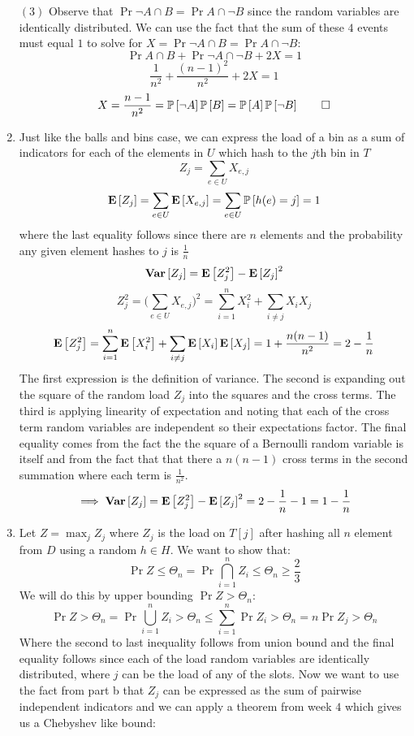 \documentclass[12pt]{article}
\begin{document}
\begin{solution}
\begin{enumerate}[label=(\alph*)]
$(3)$ Observe that $\Pr{\neg A \cap B} = \Pr{A \cap \neg B}$ since the random variables are identically distributed. We can use the fact that the sum of these $4$ events must equal $1$ to solve for $X = \Pr{\neg A \cap B} = \Pr{A \cap \neg B}$:
\[
\Pr{A \cap B} + \Pr{\neg A \cap \neg B} + 2X = 1
\]
\[
\frac{1}{n^2}+ \frac{(n-1)^2}{n^2} + 2X = 1
\]
\[
X = \frac{n-1}{n^2} = \Pr{\neg A}\Pr{B} = \Pr{A}\Pr{\neg B} \qed
\]
\item Just like the balls and bins case, we can express the load of a bin as a sum of indicators for each of the elements in $U$ which hash to the $j$th bin in $T$
\[
Z_j = \sum_{e\in U}{X_{e,j}}
\]
\[
\Exp{Z_j} = \sum_{e\in U}{\Exp{X_{e,j}}} = \sum_{e\in U}{\Pr{h(e) = j}} = 1
\]
where the last equality follows since there are $n$ elements and the probability any given element hashes to $j$ is $\frac{1}{n}$
\[
\Var{Z_j} = \Exp{Z^2_{j}} - \Exp{Z_{j}}^2
\]
\[
Z^2_{j} = \big(\sum_{e\in U}{X_{e,j}}\big)^2 = \sum_{i=1}^{n}{X^2_i} + \sum_{i\neq j}{X_iX_j}  
\]
\[
\Exp{Z^2_{j}} = \sum_{i=1}^{n}{\Exp{X^2_i}} + \sum_{i\neq j}{\Exp{X_i}\Exp{X_j}} = 1 + \frac{n(n-1)}{n^2} =2 -\frac{1}{n}
\]
The first expression is the definition of variance. The second is expanding out the square of the random load $Z_j$ into the squares and the cross terms. The third is applying linearity of expectation and noting that each of the cross term random variables are independent so their expectations factor. The final equality comes from the fact the the square of a Bernoulli random variable is itself and from the fact that that there a $n(n-1)$ cross terms in the second summation where each term is $\frac{1}{n^2}$. 
\[
\implies \Var{Z_j} = \Exp{Z^2_{j}} - \Exp{Z_{j}}^2 = 2 -\frac{1}{n} - 1 = 1 - \frac{1}{n}
\]
\item Let $Z = \max_{j}{Z_j}$ where $Z_j$ is the load on $T[j]$ after hashing all $n$ element from $D$ using a random $h\in H$. We want to show that:
\[
\Pr{Z \leq \Theta_n} = \Pr{\bigcap_{i=1}^n{Z_i \leq \Theta_n}} \geq \frac{2}{3}
\]
We will do this by upper bounding $\Pr{Z > \Theta_n}$:
\[
\Pr{Z > \Theta_n} = \Pr{\bigcup_{i=1}^n{Z_i > \Theta_n}} \leq \sum_{i=1}^n{\Pr{Z_i > \Theta_n}} = n\Pr{Z_j > \Theta_n}
\]
Where the second to last inequality follows from union bound and the final equality follows since each of the load random variables are identically distributed, where $j$ can be the load of any of the slots. Now we want to use the fact from part b that $Z_j$ can be expressed as the sum of pairwise independent indicators and we can apply a theorem from week $4$ which gives us a Chebyshev like bound:

\end{enumerate}
\end{solution}
\end{document}
